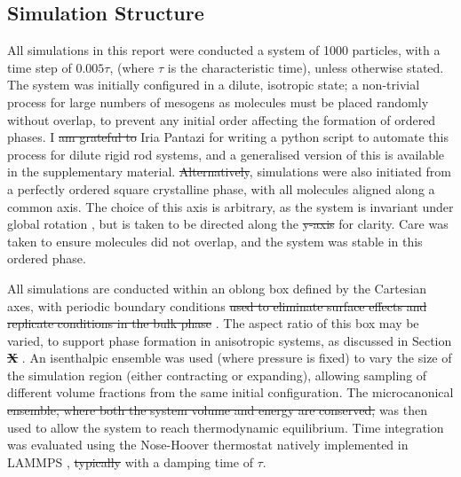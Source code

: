 \documentclass[11pt, a4paper]{article} %
\providecommand{\DIFadd}[1]{{\protect\color{blue}\uwave{#1}}} %
\providecommand{\DIFdel}[1]{{\protect\color{red}\sout{#1}}}                      %
\providecommand{\DIFaddbegin}{} %
\providecommand{\DIFaddend}{} %
\providecommand{\DIFdelbegin}{} %
\providecommand{\DIFdelend}{} %
\begin{document}
\subsection{Simulation Structure} %
All simulations in this report were conducted \DIFaddbegin \DIFadd{\textcolor{forestgreen}{for} }\DIFaddend a system of 1000 particles, with a time step of $0.005\tau$, (where $\tau$ is the characteristic time), unless otherwise stated. The system was initially configured in a dilute, isotropic state; a non-trivial process for large numbers of mesogens as molecules must be placed randomly without overlap, to prevent any initial order affecting the \DIFaddbegin \DIFadd{\textcolor{forestgreen}{subsequent} }\DIFaddend formation of ordered phases. I \DIFdelbegin \DIFdel{am grateful to }\DIFdelend \DIFaddbegin \DIFadd{\textcolor{forestgreen}{thank} }\DIFaddend Iria Pantazi for writing a python script to automate this process for dilute rigid rod systems, and a generalised version of this is available in the supplementary material. \DIFdelbegin \DIFdel{Alternatively}\DIFdelend \DIFaddbegin \DIFadd{\textcolor{forestgreen}{When studying high volume fractions}}\DIFaddend , simulations were also initiated from a perfectly ordered square crystalline phase, with all molecules aligned along a common axis. The choice of this axis is arbitrary, as the system is invariant under global rotation \cite{Nos1983}, but is taken to be directed along the \DIFdelbegin \DIFdel{y-axis }\DIFdelend \DIFaddbegin \DIFadd{\textcolor{forestgreen}{$y$}-axis }\DIFaddend for clarity. Care was taken to ensure molecules did not overlap, and \DIFaddbegin \DIFadd{\textcolor{forestgreen}{that} }\DIFaddend the system was stable in this ordered phase.

All simulations are conducted within an oblong box defined by the Cartesian axes, with periodic boundary conditions \DIFdelbegin \DIFdel{used to eliminate surface effects and replicate conditions in the bulk phase }\DIFdelend \cite{Frenkel2002}. The aspect ratio of this box may be varied, to support phase formation in anisotropic systems, as discussed in Section \DIFdelbegin \textbf{\DIFdel{X}}%
\DIFdelend \DIFaddbegin \DIFadd{\textcolor{forestgreen}{X}}\DIFaddend . An isenthalpic ensemble was used (where pressure is fixed) to vary the size of the simulation region (either contracting or expanding), allowing sampling of different volume fractions from the same initial configuration. The microcanonical \DIFdelbegin \DIFdel{ensemble, where both the system volume and energy are conserved, }\DIFdelend \DIFaddbegin \DIFadd{\textcolor{forestgreen}{$(N,V,E)$ ensemble, with conserved volume and energy}, }\DIFaddend was then used to allow the system to reach thermodynamic equilibrium. Time integration was evaluated using the Nose-Hoover thermostat \cite{Nos1984, Hoover1985} natively implemented in LAMMPS \cite{Shinoda2004}, \DIFdelbegin \DIFdel{typically }\DIFdelend with a damping time of $\tau$.
\end{document}
